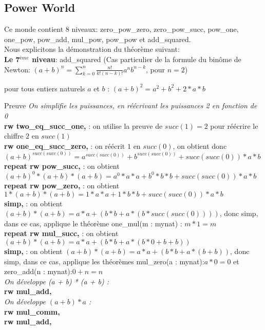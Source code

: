 \subsection{Power World}
Ce monde contient 8 niveaux: zero\_pow\_zero, zero\_pow\_succ, pow\_one, one\_pow, pow\_add, mul\_pow, pow\_pow et add\_squared.\\ 
Nous explicitons la démonstration du théorème suivant: \\
\textbf{Le 7$^{ème}$ niveau}: add\_squared (Cas particulier de la formule du binôme de Newton: $(a+b)^n=\sum_{k=0}^{n}{\frac{n!}{k!(n-k)!} a^nb^{n-k}}$, pour $n=2$)
\begin{center} pour tous entiers naturels $a$ et $b$ : $(a+b)^2=a^2+b^2+2*a*b $\end{center}
Preuve
 \textit{On simplifie les puissances, en réécrivant les puissances 2 en fonction de 0 }\\
  \textbf{rw two\_eq\_succ\_one,} : on utilise la preuve de $succ(1)=2$ pour réécrire le chiffre $2$ en $succ(1)$ \\
 \textbf{rw one\_eq\_succ\_zero,} :  on réécrit $1$ en $succ(0)$, on obtient donc $(a + b) ^ {succ (succ (0))} = a ^ {succ (succ (0)) }+ b ^ {succ (succ (0)) }+ succ (succ (0)) * a * b$\\
  \textbf{repeat {rw pow\_succ},} : on obtient $(a + b) ^ 0 * (a + b) * (a + b) = a ^ 0 * a * a + b ^ 0 * b * b + succ (succ (0)) * a * b$ \\
  \textbf{repeat {rw pow\_zero},} : on obtient $1 * (a + b) * (a + b) = 1 * a * a + 1 * b * b + succ (succ (0)) * a * b$\\
  \textbf{simp,} : on obtient $(a + b) * (a + b) = a * a + (b * b + a * (b * succ (succ (0))))
$, donc simp, dans ce cas, applique le théorème one\_mul(m : mynat) : $m * 1 = m$\\ 
  \textbf{repeat {rw mul\_succ},} : on obtient $(a + b) * (a + b) = a * a + (b * b + a * (b * 0 + b + b))$\\
  \textbf{simp,} : on obtient $(a + b) * (a + b) = a * a + (b * b + a * (b + b))$, donc simp, dans ce cas, applique les théorèmes mul\_zero(a : mynat):$a * 0 = 0$  et zero\_add(n : mynat):$0 + n = n$\\
  \textit{On développe (a + b) * (a + b) :} \\
 \textbf{rw mul\_add,} \\
 \textit{On développe $(a + b) * a$ :}\\
  \textbf{rw mul\_comm,} \\
  \textbf{rw mul\_add,} \\

